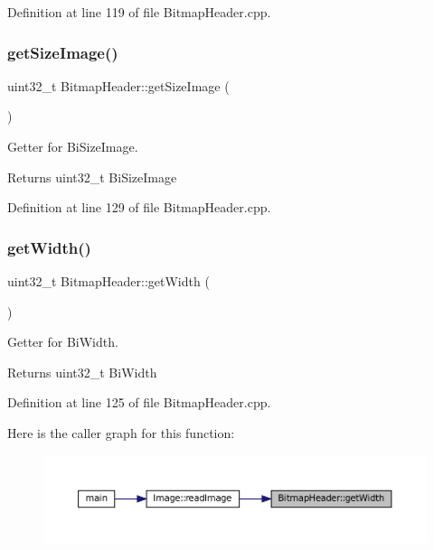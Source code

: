 Definition at line 119 of file Bitmap\+Header.\+cpp.

\mbox{\label{classBitmapHeader_aa55f157d6852ce35add8c5db54ccadae}} 
\subsubsection{\texorpdfstring{getSizeImage()}{getSizeImage()}}
{\footnotesize\ttfamily uint32\+\_\+t Bitmap\+Header\+::get\+Size\+Image (\begin{DoxyParamCaption}{ }\end{DoxyParamCaption})}



Getter for Bi\+Size\+Image. 

\begin{DoxyReturn}{Returns}
uint32\+\_\+t Bi\+Size\+Image 
\end{DoxyReturn}


Definition at line 129 of file Bitmap\+Header.\+cpp.

\mbox{\label{classBitmapHeader_af1d36ee9f3315866f05c39c2f4871e09}} 
\subsubsection{\texorpdfstring{getWidth()}{getWidth()}}
{\footnotesize\ttfamily uint32\+\_\+t Bitmap\+Header\+::get\+Width (\begin{DoxyParamCaption}{ }\end{DoxyParamCaption})}



Getter for Bi\+Width. 

\begin{DoxyReturn}{Returns}
uint32\+\_\+t Bi\+Width 
\end{DoxyReturn}


Definition at line 125 of file Bitmap\+Header.\+cpp.

Here is the caller graph for this function\+:
\nopagebreak
\begin{figure}[H]
\begin{center}
\leavevmode
\includegraphics[width=350pt]{classBitmapHeader_af1d36ee9f3315866f05c39c2f4871e09_icgraph}
\end{center}
\end{figure}
\mbox{\label{classBitmapHeader_a72e26bdf3269d382dfbdc76119c1a6aa}} 
